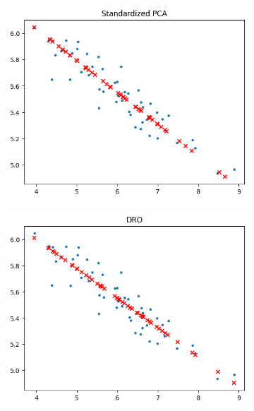 \begin{soln}
\begin{figure}[H]
\begin{subfigure}{0.5\textwidth}
        \end{subfigure}
    \end{figure}
    \begin{figure}[H]
        \begin{subfigure}{0.5\textwidth}
            \centering
            \includegraphics[scale=0.35]{Images/q24/q24_standpca.png}
        \end{subfigure}%
        \begin{subfigure}{0.5\textwidth}
            \centering
            \includegraphics[scale=0.35]{Images/q24/q24_dro.png}
        \end{subfigure}

\end{figure}
\end{soln}
